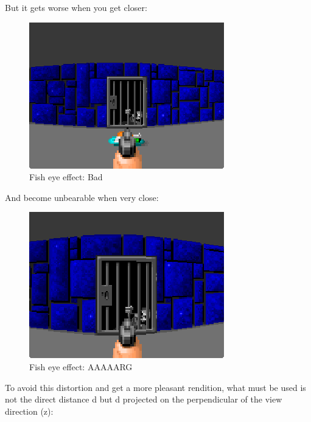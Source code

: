 But it gets worse when you get closer:
\begin{figure}[H]
\centering
 \includegraphics[width=\textwidth]{imgs/fish_eye/bad_ok.png}
 \caption{Fish eye effect: Bad} \label{fig:mips}
 \end{figure}

And become unbearable when very close:
 \begin{figure}[H]
\centering
 \includegraphics[width=\textwidth]{imgs/fish_eye/bad_bad.png}
 \caption{Fish eye effect: AAAAARG} \label{fig:mips}
 \end{figure}
 
To avoid this distortion and get a more pleasant rendition, what must be used is not the direct distance d but d projected on the perpendicular of the view direction (z):

